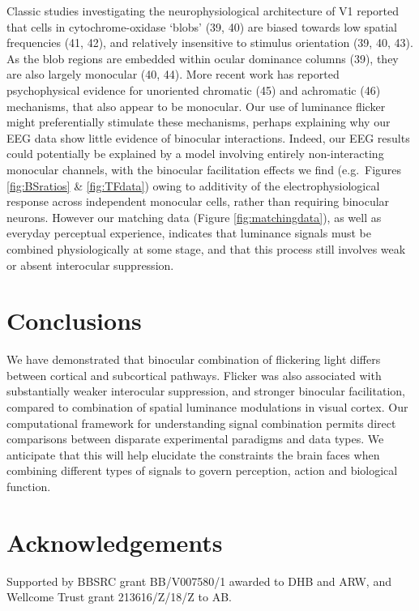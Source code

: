 \documentclass[
]{article}
\begin{document}
Classic studies investigating the neurophysiological architecture of V1 reported that cells in cytochrome-oxidase `blobs' (39, 40) are biased towards low spatial frequencies (41, 42), and relatively insensitive to stimulus orientation (39, 40, 43). As the blob regions are embedded within ocular dominance columns (39), they are also largely monocular (40, 44). More recent work has reported psychophysical evidence for unoriented chromatic (45) and achromatic (46) mechanisms, that also appear to be monocular. Our use of luminance flicker might preferentially stimulate these mechanisms, perhaps explaining why our EEG data show little evidence of binocular interactions. Indeed, our EEG results could potentially be explained by a model involving entirely non-interacting monocular channels, with the binocular facilitation effects we find (e.g.~Figures \ref{fig:BSratios} \& \ref{fig:TFdata}) owing to additivity of the electrophysiological response across independent monocular cells, rather than requiring binocular neurons. However our matching data (Figure \ref{fig:matchingdata}), as well as everyday perceptual experience, indicates that luminance signals must be combined physiologically at some stage, and that this process still involves weak or absent interocular suppression.

\hypertarget{conclusions}{%
\section{Conclusions}\label{conclusions}}

We have demonstrated that binocular combination of flickering light differs between cortical and subcortical pathways. Flicker was also associated with substantially weaker interocular suppression, and stronger binocular facilitation, compared to combination of spatial luminance modulations in visual cortex. Our computational framework for understanding signal combination permits direct comparisons between disparate experimental paradigms and data types. We anticipate that this will help elucidate the constraints the brain faces when combining different types of signals to govern perception, action and biological function.

\hypertarget{acknowledgements}{%
\section{Acknowledgements}\label{acknowledgements}}

Supported by BBSRC grant BB/V007580/1 awarded to DHB and ARW, and Wellcome Trust grant 213616/Z/18/Z to AB.
\end{document}
